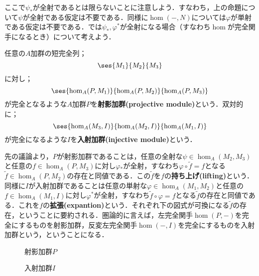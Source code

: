 ここで$\psi_\ast $が全射であるとは限らないことに注意しよう．すなわち，上の命題について$\psi$が全射である仮定は不要である．同様に$\hom(-,N)$については$\varphi$が単射である仮定は不要である．では$\psi_\ast, \varphi^\ast$が全射になる場合（すなわち$\hom$が完全関手になるとき）について考えよう．
\begin{defi}
	任意の$A$加群の短完全列；
	\[\ses{M_1}{M_2}{M_3}\]
	に対し；
	\[\ses{\hom_A(P,M_1)}{\hom_A(P,M_2)}{\hom_A(P,M_3)}\]
	が完全となるような$A$加群$P$を\textbf{射影加群(projective module)}という．双対的に；
	\[\ses{\hom_A(M_3,I)}{\hom_A(M_2,I)}{\hom_A(M_1,I)}\]
	が完全になるような$I$を\textbf{入射加群(injective module)}という．
\end{defi}

先の議論より，$P$が射影加群であることは，任意の全射な$\psi\in\hom_A(M_2,M_3)$と任意の$f\in\hom_A(P,M_3)$に対し$\varphi{}_\ast $が全射，すなわち$\varphi\circ\widetilde{f}=f$となる$\widetilde{f}\in\hom_A(P,M_2)$の存在と同値である．この$\widetilde{f}$を$f$の\textbf{持ち上げ(lifting)}という．同様に$I$が入射加群であることは任意の単射な$\varphi\in\hom_A(M_1,M_2)$と任意の$f\in\hom_A(M_1,I)$に対し$\varphi^\ast $が全射，すなわち$\widetilde{f}\circ\varphi=f$となる$\widetilde{f}$の存在と同値である．これを$f$の\textbf{拡張(expantion)}という．それぞれ下の図式が可換になる$\widetilde{f}$の存在，ということに要約される．圏論的に言えば，左完全関手$\hom(P,-)$を完全にするものを射影加群，反変左完全関手$\hom(-,I)$を完全にするものを入射加群という，ということになる．

\begin{minipage}{.45\hsize}
	\begin{figure}[H]
		\centering
		\caption{射影加群$P$}
	\end{figure}
\end{minipage}
\hfill
\begin{minipage}{.45\hsize}
	\begin{figure}[H]
		\centering
		\caption{入射加群$I$}
	\end{figure}
\end{minipage}

